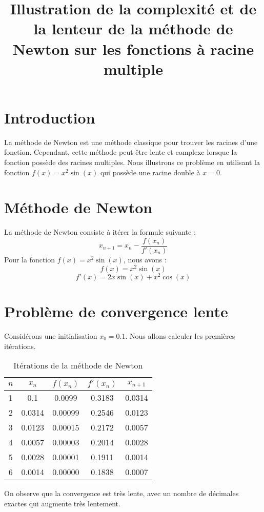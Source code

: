 \documentclass{article}
\title{Illustration de la complexité et de la lenteur de la méthode de Newton sur les fonctions à racine multiple}
\author{}
\date{}
\begin{document}
\maketitle

\section{Introduction}
La méthode de Newton est une méthode classique pour trouver les racines d'une fonction. Cependant, cette méthode peut être lente et complexe lorsque la fonction possède des racines multiples. Nous illustrons ce problème en utilisant la fonction \( f(x) = x^2 \sin(x) \) qui possède une racine double à \( x = 0 \).

\section{Méthode de Newton}
La méthode de Newton consiste à itérer la formule suivante :
\[
x_{n+1} = x_n - \frac{f(x_n)}{f'(x_n)}
\]
Pour la fonction \( f(x) = x^2 \sin(x) \), nous avons :
\[
f(x) = x^2 \sin(x)
\]
\[
f'(x) = 2x \sin(x) + x^2 \cos(x)
\]

\section{Problème de convergence lente}
Considérons une initialisation \( x_0 = 0.1 \). Nous allons calculer les premières itérations.

\begin{table}[h!]
\centering
\begin{tabular}{|c|c|c|c|c|}
\hline
$n$ & $x_n$ & $f(x_n)$ & $f'(x_n)$ & $x_{n+1}$ \\
\hline
1 & 0.1 & 0.0099 & 0.3183 & 0.0314 \\
2 & 0.0314 & 0.00099 & 0.2546 & 0.0123 \\
3 & 0.0123 & 0.00015 & 0.2172 & 0.0057 \\
4 & 0.0057 & 0.00003 & 0.2014 & 0.0028 \\
5 & 0.0028 & 0.00001 & 0.1911 & 0.0014 \\
6 & 0.0014 & 0.00000 & 0.1838 & 0.0007 \\
\hline
\end{tabular}
\caption{Itérations de la méthode de Newton}
\end{table}

On observe que la convergence est très lente, avec un nombre de décimales exactes qui augmente très lentement.
\end{document}
